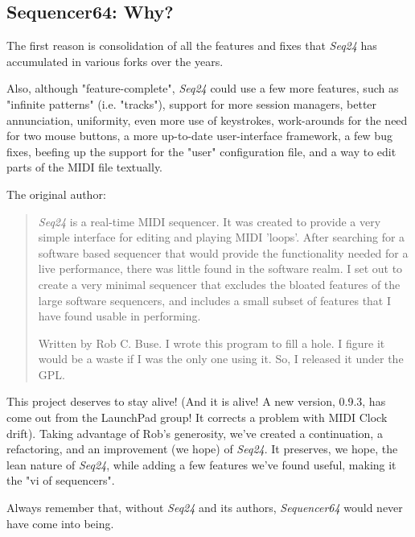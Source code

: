 \documentclass[
 11pt,
 twoside,
 a4paper,
 headinclude,
 footinclude,
 final                                 %
]{article}
\begin{document}
\subsection{Sequencer64: Why?}
\label{subsec:introduction_seq64_vs_others}

   The first reason is consolidation of all the features and fixes that
   \textsl{Seq24} has accumulated in various forks over the years.

   Also, although "feature-complete", \textsl{Seq24} could use a few more
   features, such as "infinite patterns" (i.e. "tracks"), support for more
   session managers, better annunciation, uniformity, even more use of
   keystrokes, work-arounds for the need for two mouse buttons, a more
   up-to-date user-interface framework, a few bug fixes, beefing up the support
   for the "user" configuration file, and a way to edit parts of the MIDI file
   textually.

   The original author:

   \begin{quotation}
      \textsl{Seq24} is a real-time MIDI sequencer. It was created to
      provide a very simple interface for editing and playing MIDI 'loops'.
      After searching for a software based sequencer that would provide the
      functionality needed for a live performance, there was little found in
      the software realm. I set out to create a very minimal sequencer that
      excludes the bloated features of the large software sequencers, and
      includes a small subset of features that I have found usable in
      performing. 

      Written by Rob C. Buse.  I wrote this program to fill a
      hole.  I figure it would be a waste if I was the only one
      using it.  So, I released it under the GPL.
   \end{quotation}

   This project deserves to stay alive!
   (And it is alive!  A new version, 0.9.3, has come out from the LaunchPad
   group!  It corrects a problem with MIDI Clock drift).
   Taking advantage of Rob's generosity,
   we've created a continuation, a refactoring, and an improvement (we hope) of
   \textsl{Seq24}.  It preserves, we hope, the lean nature of \textsl{Seq24},
   while adding a few features we've found useful, making it the "vi of
   sequencers".
   
   Always remember that, without \textsl{Seq24} and its authors,
   \textsl{Sequencer64} would never have come into being.
\end{document}
